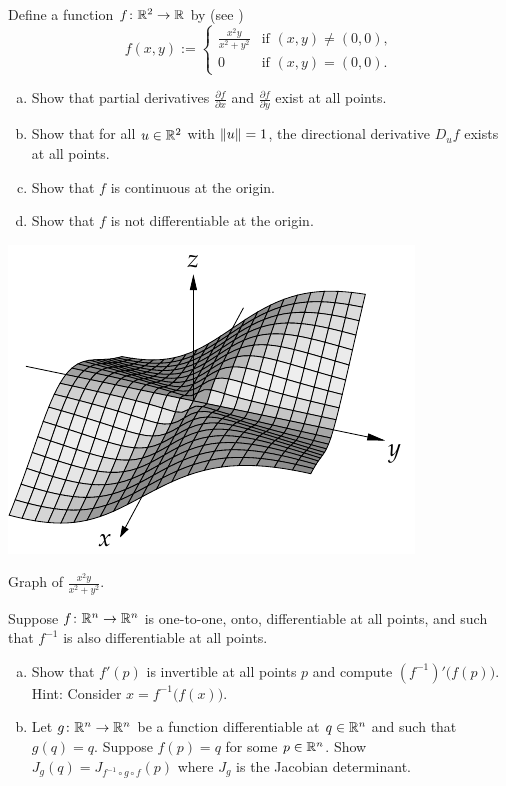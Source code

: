\begin{samepage}
\begin{exercise}
Define a function $f \colon {\mathbb{R}}^2 \to {\mathbb{R}}$ by
(see )
\begin{equation*}
f(x,y)
:=
\begin{cases}
\frac{x^2y}{x^2+y^2} & \text{if } (x,y) \not= (0,0), \\
0                    & \text{if } (x,y) = (0,0).
\end{cases}
\end{equation*}
\begin{enumerate}[a)]
\item
Show that partial derivatives 
$\frac{\partial f}{\partial x}$ and
$\frac{\partial f}{\partial y}$ exist at all points.
\item
Show that for all $u \in {\mathbb{R}}^2$ with $\lVert {u} \rVert=1$, the directional
derivative $D_u f$ exists at all points.
\item
Show that $f$ is continuous at the origin.
\item
Show that $f$ is not differentiable at the origin.
\end{enumerate}
\end{exercise}
\end{samepage}

\begin{myfigureht}
\includegraphics{figures/xsqyxsqysq}
\caption{Graph of $\frac{x^2y}{x^2+y^2}$.\label{fig:xsqyxsqysq}}
\end{myfigureht}

\begin{samepage}
\begin{exercise}
Suppose $f \colon {\mathbb{R}}^n \to {\mathbb{R}}^n$ is one-to-one, onto, differentiable at all
points, and such that $f^{-1}$ is also differentiable at all points.
\begin{enumerate}[a)]
\item
Show that $f'(p)$ is invertible at all points $p$ and compute
${(f^{-1})}'\bigl(f(p)\bigr)$.  Hint: Consider $x = f^{-1}\bigl(f(x)\bigr)$.
\item
Let $g \colon {\mathbb{R}}^n \to {\mathbb{R}}^n$ be a function differentiable at $q \in {\mathbb{R}}^n$
and such that $g(q)=q$.  Suppose $f(p) = q$ for some $p \in {\mathbb{R}}^n$.
Show $J_g(q) = J_{f^{-1} \circ g \circ f}(p)$ where $J_g$ is the Jacobian
determinant.
\end{enumerate}
\end{exercise}
\end{samepage}

